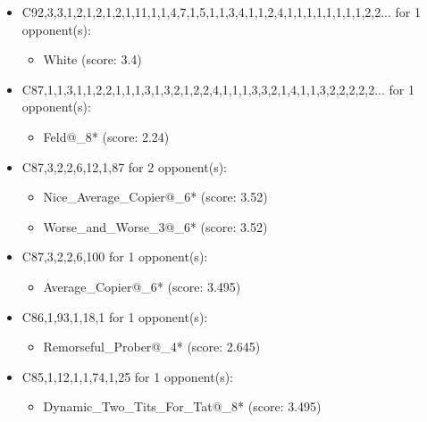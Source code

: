 \begin{appendices}
\begin{itemize}
    \item C92,3,3,1,2,1,2,1,2,1,11,1,1,4,7,1,5,1,1,3,4,1,1,2,4,1,1,1,1,1,1,1,1,2,2... for 1 opponent(s):
    \begin{multicols}{3}
         \begin{itemize}
            \item White (score: 3.4)
        \end{itemize}
     \end{multicols}
     
    \item C87,1,1,3,1,1,2,2,1,1,1,3,1,3,2,1,2,2,4,1,1,1,3,3,2,1,4,1,1,3,2,2,2,2,2... for 1 opponent(s):
    \begin{multicols}{3}
         \begin{itemize}
            \item Feld@\_8* (score: 2.24)
        \end{itemize}
     \end{multicols}
     
    \item C87,3,2,2,6,12,1,87 for 2 opponent(s):
    \begin{multicols}{3}
         \begin{itemize}
            \item Nice\_Average\_Copier@\_6* (score: 3.52)
            \item Worse\_and\_Worse\_3@\_6* (score: 3.52)
        \end{itemize}
     \end{multicols}
     
    \item C87,3,2,2,6,100 for 1 opponent(s):
    \begin{multicols}{3}
         \begin{itemize}
            \item Average\_Copier@\_6* (score: 3.495)
        \end{itemize}
     \end{multicols}
     
    \item C86,1,93,1,18,1 for 1 opponent(s):
    \begin{multicols}{3}
         \begin{itemize}
            \item Remorseful\_Prober@\_4* (score: 2.645)
        \end{itemize}
     \end{multicols}
     
    \item C85,1,12,1,1,74,1,25 for 1 opponent(s):
    \begin{multicols}{3}
         \begin{itemize}
            \item Dynamic\_Two\_Tits\_For\_Tat@\_8* (score: 3.495)
        \end{itemize}
     \end{multicols}
     

\end{itemize}
\end{appendices}
